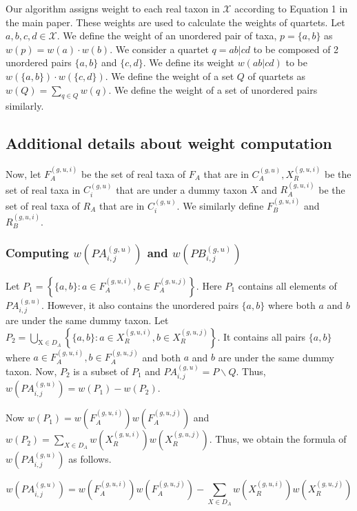 \documentclass{article}
\begin{document}
Our algorithm assigns weight to each real taxon in $\mathcal{X}$ according to Equation 1 in the main paper. These weights are used to calculate the weights of quartets. Let $a, b, c, d \in \mathcal{X}$. We define the weight of an unordered pair of taxa, $p = \{a, b\}$ as $w(p) = w(a) \cdot w(b)$. We consider a quartet $q = ab|cd$ to be composed of 2 unordered pairs $\{a, b\}$ and $\{c, d\}$. We define its weight $w(ab|cd)$ to be $w(\{a, b\}) \cdot w(\{c, d\})$. We define the weight of a set $Q$ of quartets as $w(Q) = \sum_{q \in Q} w(q)$. We define the weight of a set of unordered pairs similarly.

\subsection{Additional details about weight computation}

Now, let $F_A^{(g, u, i)}$ be the set of real taxa of $F_A$ that are in $C_A^{(g, u)}, X_R^{(g, u, i)}$ be the set of real taxa in $C_i^{(g, u)}$ that are under a dummy taxon $X$ and $R_A^{(g, u, i)}$ be the set of real taxa of $R_A$ that are in $C_i^{(g, u)}$. We similarly define $F_B^{(g, u, i)}$ and $R_B^{(g, u, i)}$.

\subsubsection{Computing $w\left(P A_{i, j}^{(g, u)}\right)$ and $w\left(P B_{i, j}^{(g, u)}\right)$}

Let $P_1 = \left\{\{a, b\}: a \in F_A^{(g, u, i)}, b \in F_A^{(g, u, j)}\right\}$. Here $P_1$ contains all elements of $P A_{i, j}^{(g, u)}$. However, it also contains the unordered pairs $\{a, b\}$ where both $a$ and $b$ are under the same dummy taxon. Let $P_2 = \bigcup_{\mathrm{X} \in D_A} \left\{\{a, b\}: a \in X_R^{(g, u, i)}, b \in X_R^{(g, u, j)}\right\}$. It contains all pairs $\{a, b\}$ where $a \in F_A^{(g, u, i)}, b \in F_A^{(g, u, j)}$ and both $a$ and $b$ are under the same dummy taxon. Now, $P_2$ is a subset of $P_1$ and $P A_{i, j}^{(g, u)} = P \backslash Q$. Thus, $w\left(P A_{i, j}^{(g, u)}\right) = w\left(P_1\right) - w\left(P_2\right)$.

Now $w\left(P_1\right) = w\left(F_A^{(g, u, i)}\right) w\left(F_A^{(g, u, j)}\right)$ and $w\left(P_2\right) = \sum_{X \in D_A} w\left(X_R^{(g, u, i)}\right) w\left(X_R^{(g, u, j)}\right)$. Thus, we obtain the formula of $w\left(P A_{i, j}^{(g, u)}\right)$ as follows.

\[
w\left(P A_{i, j}^{(g, u)}\right) = w\left(F_A^{(g, u, i)}\right) w\left(F_A^{(g, u, j)}\right) - \sum_{X \in D_A} w\left(X_R^{(g, u, i)}\right) w\left(X_R^{(g, u, j)}\right)
\]
\end{document}

